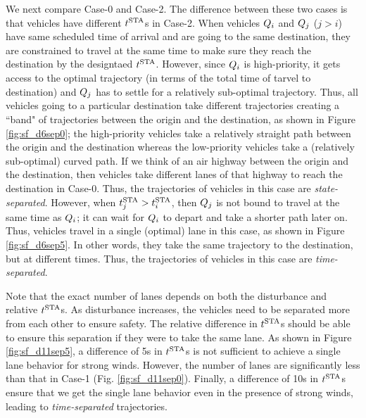 We next compare Case-0 and Case-2. The difference between these two cases is that vehicles have different $t^\text{STA}$s in Case-2. When vehicles $Q_i$ and $Q_{j}$ ($j>i$) have same scheduled time of arrival and are going to the same destination, they are constrained to travel at the same time to make sure they reach the destination by the designtaed $t^\text{STA}$. However, since $Q_i$ is high-priority, it gets access to the optimal trajectory (in terms of the total time of tarvel to destination) and $Q_{j}$ has to settle for a relatively sub-optimal trajectory. Thus, all vehicles going to a particular destination take different trajectories creating a ``band" of trajectories between the origin and the destination, as shown in Figure \ref{fig:sf_d6sep0}; the high-priority vehicles take a relatively straight path between the origin and the destination whereas the low-priority vehicles take a (relatively sub-optimal) curved path. If we think of an air highway between the origin and the destination, then vehicles take different lanes of that highway to reach the destination in Case-0. Thus, the trajectories of vehicles in this case are \textit{state-separated}. However, when $t^\text{STA}_j > t^\text{STA}_i$, then $Q_j$ is not bound to travel at the same time as $Q_i$; it can wait for $Q_i$ to depart and take a shorter path later on. Thus, vehicles travel in a single (optimal) lane in this case, as shown in Figure \ref{fig:sf_d6sep5}. In other words, they take the same trajectory to the destination, but at different times. Thus, the trajectories of vehicles in this case are \textit{time-separated}. 

Note that the exact number of lanes depends on both the disturbance and relative $t^\text{STA}$s. As disturbance increases, the vehicles need to be separated more from each other to ensure safety. The relative difference in $t^\text{STA}$s should be able to ensure this separation if they were to take the same lane. As shown in Figure \ref{fig:sf_d11sep5}, a difference of 5s in $t^\text{STA}$s is not sufficient to achieve a single lane behavior for strong winds. However, the number of lanes are significantly less than that in Case-1 (Fig. \ref{fig:sf_d11sep0}). Finally, a difference of 10s in $t^\text{STA}$s ensure that we get the single lane behavior even in the presence of strong winds, leading to \textit{time-separated} trajectories. 

